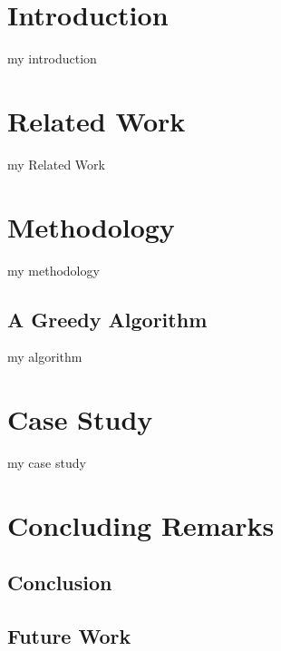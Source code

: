 \documentclass[ijgi,article,submit,moreauthors,pdftex]{Definitions/mdpi}
\begin{document}



\section{Introduction}

my introduction

\cite{Mackaness2017Generalization}


 
\section{Related Work}
\label{sec:realted_work}

my Related Work


\section{Methodology}
\label{sec:methodology}


my methodology




\subsection{A Greedy Algorithm}
\label{sec:greedy_algo}


my algorithm



\section{Case Study}
\label{sec:case_study}


my case study





\section{Concluding Remarks}
\label{sec:concluding_remarks}

\subsection{Conclusion}



\subsection{Future Work}
\end{document}
